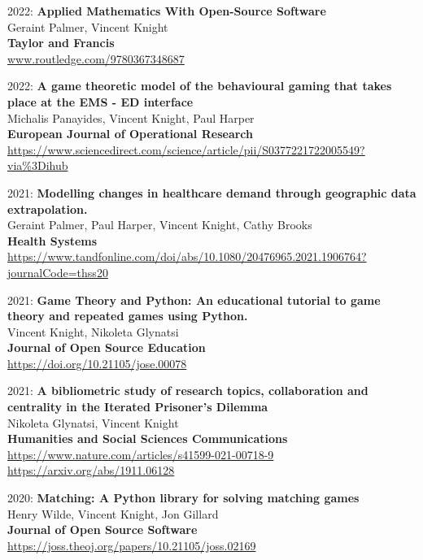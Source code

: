 \documentclass[10pt]{res} %
\begin{document}
\begin{resume}
\begin{etaremune}
\item
2022: \textbf{Applied Mathematics With Open-Source Software}\\
Geraint Palmer, Vincent Knight
\\
\textbf{Taylor and Francis}
\\
\url{www.routledge.com/9780367348687}
\\

\item
2022: \textbf{A game theoretic model of the behavioural gaming that takes place at the EMS - ED interface}\\
Michalis Panayides, Vincent Knight, Paul Harper
\\
\textbf{European Journal of Operational Research}
\\
\url{https://www.sciencedirect.com/science/article/pii/S0377221722005549?via%3Dihub}
\\

\item
2021: \textbf{Modelling changes in healthcare demand through geographic data extrapolation.}\\
Geraint Palmer, Paul Harper, Vincent Knight, Cathy Brooks
\\
\textbf{Health Systems}
\\
\url{https://www.tandfonline.com/doi/abs/10.1080/20476965.2021.1906764?journalCode=thss20}
\\

\item
2021: \textbf{Game Theory and Python: An educational tutorial to game theory and repeated games using Python.}\\
Vincent Knight, Nikoleta Glynatsi
\\
\textbf{Journal of Open Source Education}
\\
\url{https://doi.org/10.21105/jose.00078}
\\

\item
2021: \textbf{A bibliometric study of research topics, collaboration and centrality in the Iterated Prisoner's Dilemma}\\
Nikoleta Glynatsi, Vincent Knight
\\
\textbf{Humanities and Social Sciences Communications}
\\
\url{https://www.nature.com/articles/s41599-021-00718-9}
\\
\url{https://arxiv.org/abs/1911.06128}
\\

\item
2020: \textbf{Matching: A Python library for solving matching games}\\
Henry Wilde, Vincent Knight, Jon Gillard
\\
\textbf{Journal of Open Source Software}
\\
\url{https://joss.theoj.org/papers/10.21105/joss.02169}
\\


\end{etaremune}
\end{resume}
\end{document}
